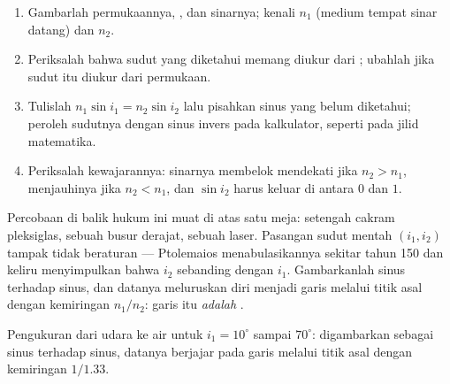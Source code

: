 \begin{method}\label{met:g10:refraction:method}
\begin{enumerate}
  \item Gambarlah permukaannya, , dan sinarnya; kenali
        $n_1$ (medium tempat sinar datang) dan $n_2$.
  \item Periksalah bahwa sudut yang diketahui memang diukur dari ; ubahlah jika sudut itu diukur dari permukaan.
  \item Tulislah $n_1 \sin i_1 = n_2 \sin i_2$ lalu pisahkan sinus yang
        belum diketahui; peroleh sudutnya dengan sinus invers pada
        kalkulator, seperti pada jilid matematika.
  \item Periksalah kewajarannya: sinarnya membelok mendekati  jika $n_2 > n_1$, menjauhinya jika $n_2 < n_1$, dan
        $\sin i_2$ harus keluar di antara $0$ dan $1$.
\end{enumerate}
\end{method}

Percobaan di balik hukum ini muat di atas satu meja: setengah cakram
pleksiglas, sebuah busur derajat, sebuah laser. Pasangan sudut mentah
$(i_1, i_2)$ tampak tidak beraturan --- Ptolemaios menabulasikannya
sekitar tahun 150 dan keliru menyimpulkan bahwa $i_2$ sebanding dengan
$i_1$. Gambarkanlah sinus terhadap sinus, dan datanya meluruskan diri
menjadi garis melalui titik asal dengan kemiringan $n_1/n_2$: garis
itu \emph{adalah} .

\begin{omfigure}

{\small Pengukuran dari udara ke air untuk $i_1 = 10^\circ$ sampai
$70^\circ$: digambarkan sebagai sinus terhadap sinus, datanya berjajar
pada garis melalui titik asal dengan kemiringan $1/1.33$.}
\end{omfigure}

